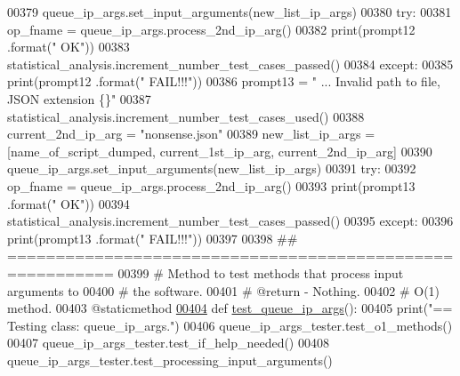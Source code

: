 \begin{DoxyCode}
00379         queue\_ip\_args.set\_input\_arguments(new\_list\_ip\_args)
00380         \textcolor{keywordflow}{try}:
00381             op\_fname = queue\_ip\_args.process\_2nd\_ip\_arg()
00382             print(prompt12 .format(\textcolor{stringliteral}{"    OK"}))
00383             statistical\_analysis.increment\_number\_test\_cases\_passed()
00384         \textcolor{keywordflow}{except}:
00385             print(prompt12 .format(\textcolor{stringliteral}{"    FAIL!!!"}))
00386         prompt13 = \textcolor{stringliteral}{"    ... Invalid path to file, JSON extension    \{\}"}
00387         statistical\_analysis.increment\_number\_test\_cases\_used()
00388         current\_2nd\_ip\_arg = \textcolor{stringliteral}{"nonsense.json"}
00389         new\_list\_ip\_args = [name\_of\_script\_dumped, current\_1st\_ip\_arg, current\_2nd\_ip\_arg]
00390         queue\_ip\_args.set\_input\_arguments(new\_list\_ip\_args)
00391         \textcolor{keywordflow}{try}:
00392             op\_fname = queue\_ip\_args.process\_2nd\_ip\_arg()
00393             print(prompt13 .format(\textcolor{stringliteral}{"    OK"}))
00394             statistical\_analysis.increment\_number\_test\_cases\_passed()
00395         \textcolor{keywordflow}{except}:
00396             print(prompt13 .format(\textcolor{stringliteral}{"    FAIL!!!"}))
00397 
00398     \textcolor{comment}{## =========================================================}
00399     \textcolor{comment}{#   Method to test methods that process input arguments to}
00400     \textcolor{comment}{#       the software.}
00401     \textcolor{comment}{#   @return - Nothing.}
00402     \textcolor{comment}{#   O(1) method.}
00403     @staticmethod
\hypertarget{queue__ip__arguments__tester_8py_source_l00404}{}\hyperlink{classutilities_1_1queue__ip__arguments__tester_1_1queue__ip__args__tester_aee90077323d94238d7f81b23e31207c3}{00404}     \textcolor{keyword}{def }\hyperlink{classutilities_1_1queue__ip__arguments__tester_1_1queue__ip__args__tester_aee90077323d94238d7f81b23e31207c3}{test\_queue\_ip\_args}():
00405         print(\textcolor{stringliteral}{"==   Testing class: queue\_ip\_args."})
00406         queue\_ip\_args\_tester.test\_o1\_methods()
00407         queue\_ip\_args\_tester.test\_if\_help\_needed()
00408         queue\_ip\_args\_tester.test\_processing\_input\_arguments()
\end{DoxyCode}
